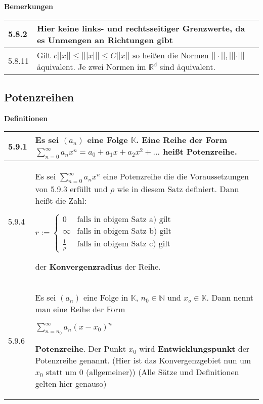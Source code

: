     \noindent
    \textbf{Bemerkungen}
    \begin{table}[H]
    \begin{tabularx}{\textwidth}{X m{16cm}}
        \toprule

        5.8.2 & Hier keine links- und rechtsseitiger Grenzwerte, da es Unmengen an Richtungen gibt \\
        \midrule
        5.8.11& Gilt $c||x|| \leq |||x||| \leq C||x||$ so hei\ss en die Normen $||\cdot||,|||\cdot|||$ äquivalent. \hfill \break
                Je zwei Normen im $\mathbb{R^d}$ sind äquivalent. \\

        \bottomrule
    \end{tabularx}
    \end{table}

    \pagebreak

\subsection{Potenzreihen}
    \noindent
    \textbf{Definitionen}
    \begin{table}[H]  
    \begin{tabularx}{\textwidth}{X m{16cm}}
        \toprule

        5.9.1 & Es sei $(a_n)$ eine Folge $\mathbb{K}$. Eine Reihe der Form $\sum^{\infty}_{n=0} a_n x^n = a_0 + a_1x+a_2x^2+ \dots$ 
                heißt \textbf{Potenzreihe}. \\
        \midrule
        5.9.4 & Es sei $\sum^{\infty}_{n=0} a_nx^n$ eine Potenzreihe die die Voraussetzungen von 5.9.3 erfüllt und $\rho$ wie in diesem Satz 
                definiert. Dann heißt die Zahl: \hfill \break
                \centerline{$r:=    \begin{cases}
                                    0 & \text{falls in obigem Satz a) gilt} \\
                                    \infty & \text{falls in obigem Satz b) gilt} \\
                                    \frac{1}{\rho} & \text{falls in obigem Satz c) gilt}
                                    \end{cases}$ }
                der \textbf{Konvergenzradius} der Reihe. \\
        \midrule
        5.9.6 & Es sei $(a_n)$ eine Folge in $\mathbb{K}$, $n_0 \in \mathbb{N}$ und $x_o \in \mathbb{K}$. Dann nennt man eine Reihe der Form \hfill \break
                \centerline{$\sum^{\infty}_{n=n_0}a_n(x-x_0)^n$}
                \textbf{Potenzreihe}. Der Punkt $x_0$ wird \textbf{Entwicklungspunkt} der Potenzreihe genannt. \hfill \break
                (Hier ist das Konvergenzgebiet nun um $x_0$ statt um 0 (allgemeiner)) \hfill \break
                (Alle Sätze und Definitionen gelten hier genauso) \\

        \bottomrule

    \end{tabularx}
    \end{table}

